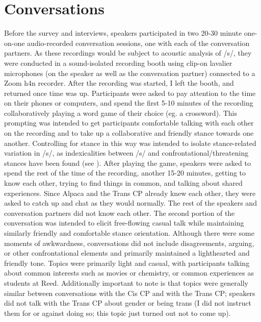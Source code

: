 \documentclass[12pt,twoside]{reedthesis}
\begin{document}
\section{Conversations}
Before the survey and interviews, speakers participated in two 20-30 minute one-on-one audio-recorded conversation sessions, one with each of the conversation partners. As these recordings would be subject to acoustic analysis of /s/, they were conducted in a sound-isolated recording booth using clip-on lavalier microphones (on the speaker as well as the conversation partner) connected to a Zoom h4n recorder. After the recording was started, I left the booth, and returned once time was up. Participants were asked to pay attention to the time on their phones or computers, and spend the first 5-10 minutes of the recording collaboratively playing a word game of their choice (eg. a crossword). This prompting was intended to get participants comfortable talking with each other on the recording and to take up a collaborative and friendly stance towards one another. Controlling for stance in this way was intended to isolate stance-related variation in /s/, as indexicalities between /s/ and confrontational/threatening stances have been found (see \cite{holmes-elliott_substance_2017}).  After playing the game, speakers were asked to spend the rest of the time of the recording, another 15-20 minutes, getting to know each other, trying to find things in common, and talking about shared experiences. Since Alpaca and the Trans CP already knew each other, they were asked to catch up and chat as they would normally. The rest of the speakers and conversation partners did not know each other. The second portion of the conversation was intended to elicit free-flowing casual talk while maintaining similarly friendly and comfortable stance orientation. Although there were some moments of awkwardness, conversations did not include disagreements, arguing, or other confrontational elements and primarily maintained a lighthearted and friendly tone. Topics were primarily light and casual, with participants talking about common interests such as movies or chemistry, or common experiences as students at Reed. Additionally important to note is that topics were generally similar between conversations with the Cis CP and with the Trans CP; speakers did not talk with the Trans CP about gender or being trans (I did not instruct them for or against doing so; this topic just turned out not to come up).
\end{document}
